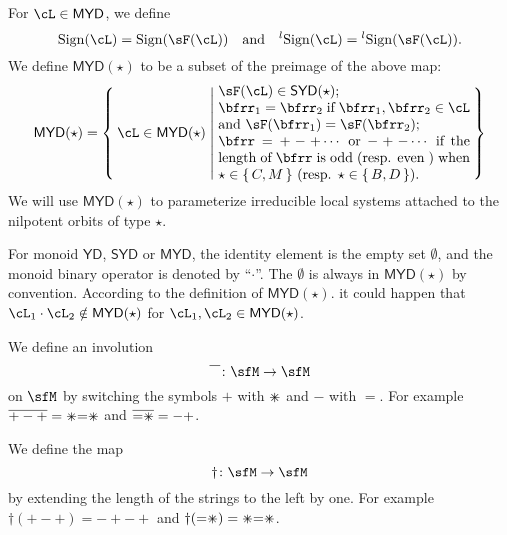 \documentclass[12pt,a4paper]{amsart}
\def\YD{{\mathsf{YD}}}
\def\SYD{{\mathsf{SYD}}}
\def\MYD{{\mathsf{MYD}}}
\numberwithin{equation}{section}
\theoremstyle{remark}
\def\lsign{{}^l\mathrm{Sign}}
\def\ssign{\mathrm{Sign}}
\def\umm{{=}}
\def\upp{{\ast}}
\def\upp{
  {{\setbox0\hbox{$\times$}
      \rlap{\hbox to \wd0{\hss$+$\hss}}\box0
    }}
}
\begin{document}
\begin{itemize}
        For $\cL\in\MYD$, we define
        \[
        \ssign(\cL) = \ssign(\sF(\cL)) \quad \text{and} \quad \lsign(\cL) = \lsign(\sF(\cL)).
        \]
        We define $\MYD(\star)$ to be a subset of the preimage of the above map:
        \[
        \MYD(\star) =\Set{\cL\in \MYD(\star)|\begin{minipage}{18em}
            $\sF(\cL)\in \SYD(\star)$;\\
            $\bfrr_{1}=\bfrr_{2}$ if $\bfrr_1, \bfrr_2\in \cL$ and
            $\sF(\bfrr_{1})=\sF(\bfrr_{2})$;\\
            $\bfrr = +-+\cdots $ or $-+-\cdots $ if the length of $\bfrr$ is odd
            (resp. even ) when $\star \in \set{C,M}$ (resp.
            $\star\in \set{B,D}$).
          \end{minipage}
        }
        \]
        We will use $\MYD(\star)$ to parameterize irreducible local systems
        attached to the nilpotent orbits of type $\star$.
\end{itemize}
For monoid  $\YD$, $\SYD$ or $\MYD$, the identity element is the empty set
$\emptyset$, and the monoid binary operator is denoted by
``$\cdot$''.
  The  $\emptyset$ is  always in
$\MYD(\star)$ by convention.
According to the definition of $\MYD(\star)$.  it could happen that $\cL_{1}\cdot \cL_{2}\notin \MYD(\star)$ for
$\cL_{1},\cL_{2}\in \MYD(\star)$.

%

We define an involution
\begin{equation}\label{eq:def.bar}
 \overline{\phantom{+}}\colon \sfM\rightarrow \sfM
\end{equation}
on $\sfM$  by
switching the symbols $+$ with $\upp$  and $-$ with $\umm$.
For example $\overline{+-+}= \upp\umm\upp$ and $\overline{ \umm\upp } = -+$.

We define the map
\begin{equation}\label{eq:def.dagger}
  \dagger\colon \sfM\rightarrow \sfM
\end{equation}
by extending the length of
the strings to the left by one.
For example $\dagger(+-+) = -+-+$ and $\dagger(\umm\upp)=\upp\umm\upp$.
\end{document}

